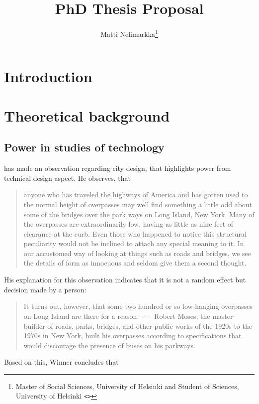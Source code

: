 \documentclass[12pt,a4paper]{article}
\author{Matti Nelimarkka\footnote{Master of Social Sciences, University of Helsinki and Student of Sciences, University of Helsinki \texttt{<\email{matti.nelimarkka@hiit.fi}>}}}
\title{PhD Thesis Proposal}
\begin{document}
\maketitle

\tableofcontents

\newpage

\section{Introduction}

\section{Theoretical background}

\subsection{Power in studies of technology}

 has made an observation regarding city design, that highlights power from technical design aspect. He observes, that

\begin{quote}
anyone who has traveled the highways of America and has gotten used to the normal height of overpasses may well find something a little odd about some of the bridges over the park ways on Long Island, New York. Many of the overpasses are extraordinarily low, having as little as nine feet of clearance at the curb. Even those who happened to notice this structural peculiarity would not be inclined to attach any special meaning to it. In our accustomed way of looking at things such as roads and bridges, we see the details of form as innocuous and seldom give them a second thought.
\end{quote}

His explanation for this observation indicates that it is not a random effect but decision made by a person:

\begin{quote}
It turns out, however, that some two hundred or so low-hanging overpasses on Long Island are there for a reason. \texttt{- -} Robert Moses, the master builder of roads, parks, bridges, and other public works of the 1920s to the 1970s in New York, built his overpasses according to specifications that would discourage the presence of buses on his parkways.
\end{quote}

Based on this, Winner concludes that
\end{document}
